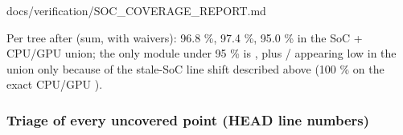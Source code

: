 \begin{relocated}{docs/verification/SOC_COVERAGE_REPORT.md}
\begin{landscape}
\end{landscape}

Per tree after (sum, with waivers):  96.8 \%, 
97.4 \%,  95.0 \% in the SoC + CPU/GPU union; the only
module under 95 \% is , plus /
appearing low in the union only because of the stale-SoC line shift
described above (100 \% on the exact CPU/GPU ).

\subsubsection{Triage of every uncovered point (HEAD line numbers)}\label{tm:flow:soc-coverage-report:triage-of-every-uncovered-point-head-line-numbers}

{\footnotesize\setlength{\tabcolsep}{3pt}

}
\end{relocated}
